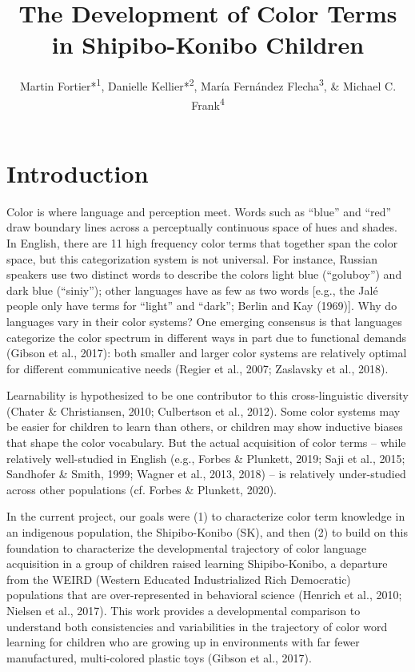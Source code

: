 \documentclass[
  english,
  ,apa7,floatsintext]{apa6}
\title{The Development of Color Terms in Shipibo-Konibo Children}
\author{Martin Fortier*\textsuperscript{1}, Danielle Kellier*\textsuperscript{2}, María Fernández Flecha\textsuperscript{3}, \& Michael C. Frank\textsuperscript{4}}
\date{}
\affiliation{\vspace{0.5cm}\textsuperscript{1} Paris Sciences et Lettres University, Paris, France\\\textsuperscript{2} University of Pennsylvania, Philadelphia, Pennsylvania, United States of America\\\textsuperscript{3} Pontificia Universidad Católica del Perú, Lima, Peru\\\textsuperscript{4} Stanford University, Stanford, California, United States of America}
\begin{document}
\maketitle

\hypertarget{introduction}{%
\section{Introduction}\label{introduction}}

Color is where language and perception meet. Words such as ``blue'' and ``red'' draw boundary lines across a perceptually continuous space of hues and shades. In English, there are 11 high frequency color terms that together span the color space, but this categorization system is not universal. For instance, Russian speakers use two distinct words to describe the colors light blue (``goluboy'') and dark blue (``siniy''); other languages have as few as two words {[}e.g., the Jalé people only have terms for ``light'' and ``dark''; Berlin and Kay (1969){]}. Why do languages vary in their color systems? One emerging consensus is that languages categorize the color spectrum in different ways in part due to functional demands (Gibson et al., 2017): both smaller and larger color systems are relatively optimal for different communicative needs (Regier et al., 2007; Zaslavsky et al., 2018).

Learnability is hypothesized to be one contributor to this cross-linguistic diversity (Chater \& Christiansen, 2010; Culbertson et al., 2012). Some color systems may be easier for children to learn than others, or children may show inductive biases that shape the color vocabulary. But the actual acquisition of color terms -- while relatively well-studied in English (e.g., Forbes \& Plunkett, 2019; Saji et al., 2015; Sandhofer \& Smith, 1999; Wagner et al., 2013, 2018) -- is relatively under-studied across other populations (cf. Forbes \& Plunkett, 2020).

In the current project, our goals were (1) to characterize color term knowledge in an indigenous population, the Shipibo-Konibo (SK), and then (2) to build on this foundation to characterize the developmental trajectory of color language acquisition in a group of children raised learning Shipibo-Konibo, a departure from the WEIRD (Western Educated Industrialized Rich Democratic) populations that are over-represented in behavioral science (Henrich et al., 2010; Nielsen et al., 2017). This work provides a developmental comparison to understand both consistencies and variabilities in the trajectory of color word learning for children who are growing up in environments with far fewer manufactured, multi-colored plastic toys (Gibson et al., 2017).
\end{document}
